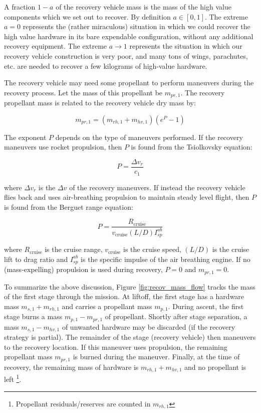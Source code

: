 \documentclass[conf]{new-aiaa}
\begin{document}
A fraction $1-a$ of the recovery vehicle mass is the mass of the high value components which we set out to recover. By definition $a \in [0, 1]$. The extreme $a=0$ represents the (rather miraculous) situation in which we could recover the high value hardware in its bare expendable configuration, without any additional recovery equipment. The extreme $a \rightarrow 1$ represents the situation in which our recovery vehicle construction is very poor, and many tons of wings, parachutes, etc. are needed to recover a few kilograms of high-value hardware.

The recovery vehicle may need some propellant to perform maneuvers during the recovery process. Let the mass of this propellant be $m_{pr,1}$. The recovery propellant mass is related to the recovery vehicle dry mass by:

\begin{equation}
m_{pr,1} = (m_{rh,1} + m_{hv,1}) \left( e^P - 1 \right)
\end{equation}

The exponent $P$ depends on the type of maneuvers performed. If the recovery maneuvers use rocket propulsion, then $P$ is found from the Tsiolkovsky equation:

\begin{equation}
P = \frac{\Delta v_r}{c_1}
\end{equation}

where $\Delta v_r$ is the $\Delta v$ of the recovery maneuvers. If instead the recovery vehicle flies back and uses air-breathing propulsion to maintain steady level flight, then $P$ is found from the Berguet range equation:

\begin{equation}
P =  \frac{R_{\mathrm{cruise}}}{v_{\mathrm{cruise}} (L/D) I_{sp}^{ab}}
\end{equation}

where $R_{\mathrm{cruise}}$ is the cruise range, $v_{\mathrm{cruise}}$ is the cruise speed, $(L/D)$ is the cruise lift to drag ratio and $I_{sp}^{ab}$ is the specific impulse of the air breathing engine. If no (mass-expelling) propulsion is used during recovery, $P = 0$ and $m_{pr,1} = 0$.

To summarize the above discussion, Figure \ref{fig:recov_mass_flow} tracks the mass of the first stage through the mission. At liftoff, the first stage has a hardware mass $m_{s,1} + m_{rh,1}$ and carries a propellant mass $m_{p,1}$. During ascent, the first stage burns a mass $m_{p,1} - m_{pr,1}$ of propellant. Shortly after stage separation, a mass $m_{s,1} - m_{hv,1}$ of unwanted hardware may be discarded (if the recovery strategy is partial). The remainder of the stage  (recovery vehicle) then maneuvers to the recovery location. If this maneuver uses propulsion, the remaining propellant mass $m_{pr,1}$ is burned during the maneuver. Finally, at the time of recovery, the remaining mass of hardware is $m_{rh,1} + m_{hv,1}$ and no propellant is left \footnote{Propellant residuals/reserves are counted in $m_{rh,1}$}.
\end{document}
